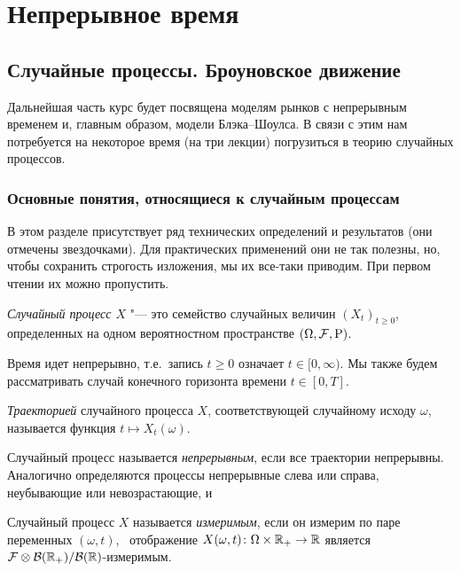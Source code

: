\part{Непрерывное время}
\chapter{Случайные процессы. Броуновское движение}
\label{ch:processes}
\chaptertoc

Дальнейшая часть курс будет посвящена моделям рынков с непрерывным временем и, главным образом, модели Блэка--Шоулса.
В связи с этим нам потребуется на некоторое время (на три лекции) погрузиться в теорию случайных процессов.

\section{Основные понятия, относящиеся к случайным процессам}

В этом разделе присутствует ряд технических определений и результатов (они отмечены звездочками).
Для практических применений они не так полезны, но, чтобы сохранить строгость изложения, мы их все-таки приводим.
При первом чтении их можно пропустить.

\begin{definition}
\emph{Случайный процесс $X$} "--- это семейство случайных величин $(X_t)_{t\ge 0}$, определенных на одном вероятностном пространстве $(\Omega,\mathcal{F},\mathrm{P})$.
\end{definition}

Время идет непрерывно, т.е.\ запись $t\ge0$ означает $t\in[0,\infty)$.
Мы также будем рассматривать случай конечного горизонта времени $t\in[0,T]$.

\begin{definition}
\emph{Траекторией} случайного процесса $X$, соответствующей случайному исходу $\omega$, называется функция $t\mapsto X_t(\omega)$.

Случайный процесс называется \emph{непрерывным}, если все траектории непрерывны.
Аналогично определяются процессы непрерывные слева или справа, неубывающие или невозрастающие, и \td
\end{definition}

\begin{definition}[$*$]
Случайный процесс $X$ называется \emph{измеримым}, если он измерим по паре переменных $(\omega,t)$, \te\ отображение $X(\omega,t)\colon\Omega\times\mathbb{R}_+ \to \mathbb{R}$ является $\mathcal{F}\otimes\mathcal{B}(\mathbb{R}_+)/\mathcal{B}(\mathbb{R})$-измеримым.
\end{definition}


